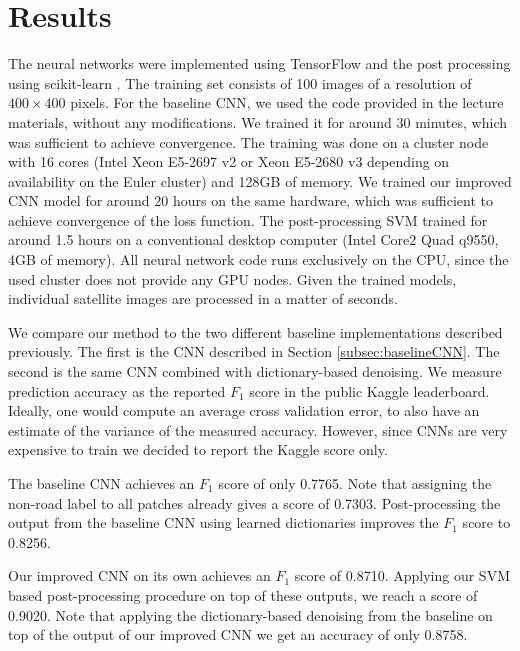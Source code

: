 \documentclass[10pt,conference,compsocconf]{IEEEtran}
\begin{document}
\section{Results}
\label{sec:results}
The neural networks were implemented using TensorFlow \cite{tensorflow.2015} and the post processing using scikit-learn \cite{sklearn.2011}. The training set consists of 100 images of a resolution of $ 400 \times 400 $ pixels. For the baseline CNN, we used the code provided in the lecture materials, without any modifications. We trained it for around 30 minutes, which was sufficient to achieve convergence. The training was done on a cluster node with 16 cores (Intel Xeon E5-2697 v2 or Xeon E5-2680 v3 depending on availability on the Euler cluster) and 128GB of memory. We trained our improved CNN model for around 20 hours on the same hardware, which was sufficient to achieve convergence of the loss function. The post-processing SVM trained for around 1.5 hours on a conventional desktop computer (Intel Core2 Quad q9550, 4GB of memory). All neural network code runs exclusively on the CPU, since the used cluster does not provide any GPU nodes. Given the trained models, individual satellite images are processed in a matter of seconds.

\par 
We compare our method to the two different baseline implementations described previously. The first is the CNN described in Section \ref{subsec:baselineCNN}. The second is the same CNN combined with dictionary-based denoising. We measure prediction accuracy as the reported $ F_1 $ score in the public Kaggle leaderboard. Ideally, one would compute an average cross validation error, to also have an estimate of the variance of the measured accuracy. However, since CNNs are very expensive to train we decided to report the Kaggle score only.

\par
The baseline CNN achieves an $ F_1 $ score of only 0.7765. Note that assigning the non-road label to all patches already gives a score of 0.7303. Post-processing the output from the baseline CNN using learned dictionaries improves the $ F_1 $ score to 0.8256. 

\par
Our improved CNN on its own achieves an $ F_1 $ score of 0.8710. Applying our SVM based post-processing procedure on top of these outputs, we reach a score of 0.9020. Note that applying the dictionary-based denoising from the baseline on top of the output of our improved CNN we get an accuracy of only 0.8758.
\end{document}
